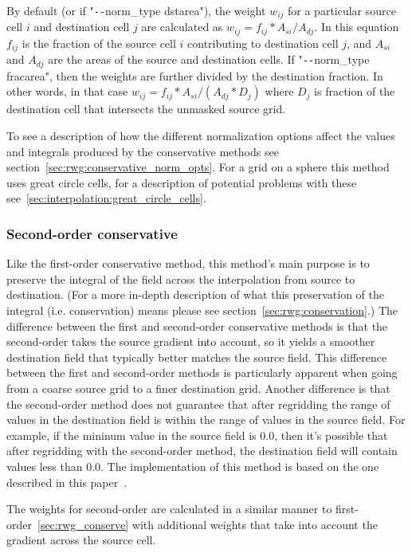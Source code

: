  By default (or if "\verb+--+norm\_type dstarea"), the weight $w_{ij}$ for a particular source cell $i$ and destination cell $j$ are calculated as $w_{ij}=f_{ij} * A_{si}/A_{dj}$. 
In this equation $f_{ij}$ is the fraction of the source cell $i$ contributing to destination cell $j$, and $A_{si}$ and $A_{dj}$ are the areas of the source and 
destination cells. If "\verb+--+norm\_type fracarea", then the weights are further divided by the destination fraction. In other words, in that case $w_{ij}=f_{ij} * A_{si}/(A_{dj}*D_j)$ where $D_j$ is fraction of the destination cell that intersects the unmasked source grid. 

To see a description of how the different normalization options affect the values and integrals produced by the conservative methods see section~\ref{sec:rwg:conservative_norm_opts}. For a grid on a sphere this method uses great circle cells, for a description of potential problems with these see~\ref{sec:interpolation:great_circle_cells}.

\subsubsection{Second-order conservative}\label{sec:rwg_conserve2d}
 Like the first-order conservative method, this method's main purpose is to preserve the integral of the field across the interpolation from source to destination.  
 (For a more in-depth description of what this preservation of the integral (i.e. conservation) means please see section~\ref{sec:rwg:conservation}.)  The difference between the first and second-order conservative methods is that the second-order takes the source gradient into account, so
 it yields a smoother destination field that typically better matches the source field. This difference between the first and second-order methods 
 is particularly apparent when going from a coarse source grid to a finer destination grid. Another difference is that the second-order method
  does not guarantee that after regridding the range of values in the destination field is within the range of 
 values in the source field. For example, if the mininum value in the source field is 0.0, then it's possible that after regridding with the 
 second-order method, the destination field will contain values less than 0.0. The implementation of this method is based on the one described in this paper~\cite{ConservativeOrder2}.

  The weights for second-order are calculated in a similar manner to first-order~\ref{sec:rwg_conserve} with additional weights that take into account the gradient across the source cell. 

